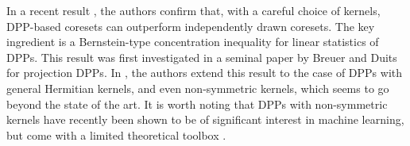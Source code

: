 In a recent result \cite{NIPS2024}, the authors confirm that, with a careful choice of kernels, DPP-based coresets can outperform independently drawn coresets. The key ingredient is a Bernstein-type concentration inequality for linear statistics of DPPs. This result was first investigated in a seminal paper \cite{BREUER2014441} by Breuer and Duits for projection DPPs. In \cite{NIPS2024}, the authors extend this result to the case of DPPs with general Hermitian kernels, and even non-symmetric kernels, which seems to go beyond the state of the art. It is worth noting that DPPs with non-symmetric kernels have recently been shown to be of significant interest in machine learning, but come with a limited theoretical toolbox \cite{gartrell2019learning, gartrell2020scalable, han2022scalable}.

\begin{comment}
    In the context of coresets, a more precise motivation is that sampling with negative dependent processes results in smaller variance of linear statistics compared to independent sampling. To elaborate, we will recall a few standard concepts from point process theory.


\begin{remark}
It is easy to see that $L_{\mathcal S}(f)$ could be realized as a linear statistic
\begin{equation} \label{eq:li-stat}
    L_{\mathcal S}(f) = \sum_{x\in \mathcal S} \frac{f(x)}{\mathbb P(x\in \mathcal S)} = \Lambda_{\mathcal S}\Big ( \frac{f(\cdot)}{\mathbb P(\cdot \in \mathcal S)}\Big ) \cdot 
\end{equation}
\end{remark}

A point process $\mathcal S$ on $\mathcal X$ is said to be \textit{pairwise negatively correlated} (pNC) if 
\[ \mathbb P(x \in \mathcal S, y \in\mathcal S) \le \mathbb P(x\in \mathcal S) \mathbb P(y \in \mathcal S), \quad \forall x,y \in \mathcal X.\]
Given a point process $\mathcal S$ on $\mathcal X$, let us denote by $\mathcal S_{\poi}$ the Poisson point process on $\mathcal X$ with the same first intensity as $\mathcal S$, i.e.,
\[ \mathbb P(x \in \mathcal S_\poi) = \mathbb P(x\in\mathcal S), \quad \forall x\in \mathcal X.\]

\begin{proposition} \label{p:var-reduction}
    Let $\mathcal S$ be a pNC point process on $\mathcal X$ and $\mathcal S_\poi$ be defined as above. Let
    $f: \mathcal X \rightarrow \mathbb R$ be any test function. Then
    \[\var[\Lambda_{\mathcal S}(f)] \le \var[\Lambda_{\mathcal S_\poi}(f)].\]
\end{proposition}


\end{comment}
